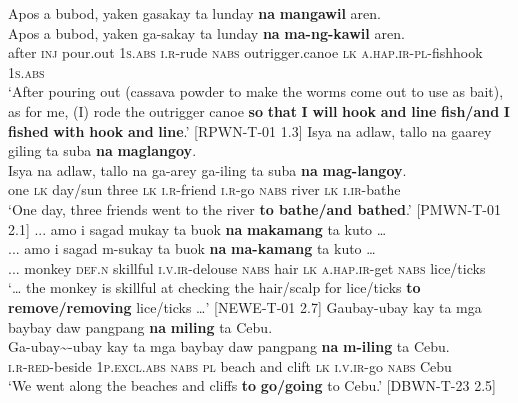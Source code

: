 \ea
Apos a  bubod,  yaken  gasakay  ta  lunday \textbf{na}  \textbf{mangawil}  aren. \smallskip\\
\gll Apos\footnotemark{}  a  bubod,  yaken  ga-sakay  ta  lunday \textbf{na}  \textbf{ma-ng-kawil}  aren. \\
after  \textsc{inj}  pour.out  1\textsc{s.abs}  \textsc{i.r}-rude  \textsc{nabs}  outrigger.canoe
\textsc{lk}  \textsc{a.hap.ir}-\textsc{pl}-fishhook  1\textsc{s.abs} \\
\glt `After pouring out (cassava powder to make the worms come out to use as bait), as for me, (I) rode the outrigger canoe \textbf{so} \textbf{that} \textbf{I} \textbf{will} \textbf{hook} \textbf{and} \textbf{line} \textbf{fish/and} \textbf{I} \textbf{fished} \textbf{with} \textbf{hook} \textbf{and} \textbf{line}.’ [RPWN-T-01 1.3]
\z
\ea
Isya  na  adlaw,  tallo  na  gaarey  giling  ta  suba \textbf{na}  \textbf{maglangoy}. \smallskip\\
\gll Isya  na  adlaw,  tallo  na  ga-arey  ga-iling  ta  suba \textbf{na}  \textbf{mag-langoy}. \\
one  \textsc{lk}  day/sun  three  \textsc{lk}  \textsc{i.r}-friend  \textsc{i.r}-go  \textsc{nabs}  river
\textsc{lk}  \textsc{i.ir}-bathe \\
\glt `One day, three friends went to the river \textbf{to bathe/and bathed}.’ [PMWN-T-01  2.1]
\z
\ea
... amo  i  sagad  mukay  ta  buok  \textbf{na}  \textbf{makamang} ta  kuto … \smallskip\\
\gll ... amo  i  sagad  m-sukay  ta  buok  \textbf{na}  \textbf{ma-kamang} ta  kuto … \\
... monkey  \textsc{def.n}  skillful  \textsc{i.v.ir}-delouse  \textsc{nabs}  hair  \textsc{lk}  \textsc{a.hap.ir}-get
\textsc{nabs}  lice/ticks \\
\glt `… the monkey is skillful at checking the hair/scalp for lice/ticks \textbf{to} \textbf{remove/removing} lice/ticks …’ [NEWE-T-01 2.7]
\z
\ea
Gaubay-ubay  kay  ta  mga  baybay  daw  pangpang \textbf{na}  \textbf{miling}  ta  Cebu. \smallskip\\
\gll Ga-ubay\sim{}-ubay  kay  ta  mga  baybay  daw  pangpang \textbf{na}  \textbf{m-iling}  ta  Cebu. \\
\textsc{i.r}-\textsc{red}-beside  1\textsc{p.excl.abs}  \textsc{nabs}  \textsc{pl}  beach  and    clift
\textsc{lk}  \textsc{i.v.ir}-go  \textsc{nabs}  Cebu \\
\glt `We went along the beaches and cliffs \textbf{to} \textbf{go/going} to Cebu.’  [DBWN-T-23 2.5]
